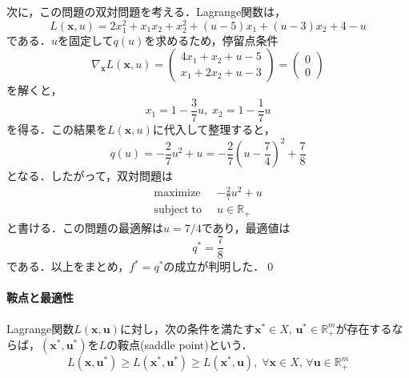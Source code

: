 \documentclass{jsreport}
\begin{document}
次に，この問題の双対問題を考える．Lagrange関数は，
\begin{equation}
  L(\bm{x}, u) = 2x_1^2 + x_1x_2 + x_2^2 + (u - 5)x_1 + (u - 3)x_2 + 4 - u \nonumber
\end{equation}
である．$u$を固定して$q(u)$を求めるため，停留点条件
\begin{equation}
  \nabla_{\bm{x}} L(\bm{x}, u) = \left(
  \begin{array}{c}
    4x_1 + x_2 + u - 5 \\
    x_1 + 2x_2 + u - 3
  \end{array}
  \right) = \left(
  \begin{array}{c}
    0 \\
    0
  \end{array}
  \right) \nonumber
\end{equation}
を解くと，
\begin{equation}
  x_1 = 1 - \frac{3}{7} u, \; x_2 = 1 - \frac{1}{7} u \nonumber
\end{equation}
を得る．この結果を$L(\bm{x}, u)$に代入して整理すると，
\begin{equation}
  q(u) = -\frac{2}{7} u^2 + u = - \frac{2}{7}\left(u - \frac{7}{4}\right)^2 + \frac{7}{8} \nonumber
\end{equation}
となる．したがって，双対問題は
\begin{align}
  \mathrm{maximize} \; \; &-\frac{2}{7} u^2 + u \nonumber\\
  \mathrm{subject \; to} \; \; &u \in \mathbb{R}_{+} \nonumber
\end{align}
と書ける．この問題の最適解は$u = 7/4$であり，最適値は
\begin{equation}
  q^{*} = \frac{7}{8} \nonumber
\end{equation}
である．以上をまとめ，$f^{*} = q^{*}$の成立が判明した．\qed

\paragraph{鞍点と最適性}
Lagrange関数$L(\bm{x}, \bm{u})$に対し，次の条件を満たす$\bm{x}^{*} \in X, \, \bm{u}^{*} \in \mathbb{R}_{+}^{m}$が存在するならば，$(\bm{x}^{*}, \bm{u}^{*})$を$L$の鞍点(saddle point)という．
\begin{equation}\label{eq:saddle}
  L(\bm{x}, \bm{u}^{*}) \geq L(\bm{x}^{*}, \bm{u}^{*}) \geq L(\bm{x}^{*}, \bm{u}), \; \forall \bm{x} \in X, \, \forall \bm{u} \in \mathbb{R}_{+}^{m}
\end{equation}
\end{document}
